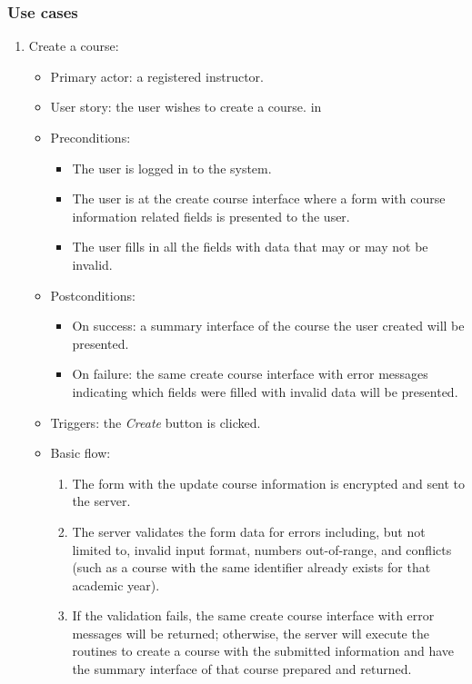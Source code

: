 \subsubsection{Use cases}
\begin{enumerate}
\item Create a course:
\begin{itemize}
    \item Primary actor: a registered instructor.
    \item User story: the user wishes to create a course.
     in
    \item Preconditions: 
        \begin{itemize}
            \item The user is logged in to the system.
            \item The user is at the create course interface where a form with
                course information related fields is presented to the user.
            \item The user fills in all the fields with data that may or
                may not be invalid.
        \end{itemize}
    \item Postconditions:
        \begin{itemize}
            \item On success: a summary interface of the course the user created
                will be presented.
            \item On failure: the same create course interface with error
                messages indicating which fields were filled with invalid data
                will be presented.
        \end{itemize}
    \item Triggers: the \emph{Create} button is clicked.
    \item Basic flow:
        \begin{enumerate}
            \item The form with the update course information is encrypted and
                sent to the server.
            \item The server validates the form data for errors including,
                but not limited to, invalid input format, numbers out-of-range,
                and conflicts (such as a course with the same identifier  
                already exists for that academic year).
            \item If the validation fails, the same create course interface
                with error messages will be returned; otherwise, the server will
                execute the routines to create a course with the submitted 
                information and have the summary interface of that course prepared
                and returned.
        \end{enumerate}
\end{itemize}


\end{enumerate}
